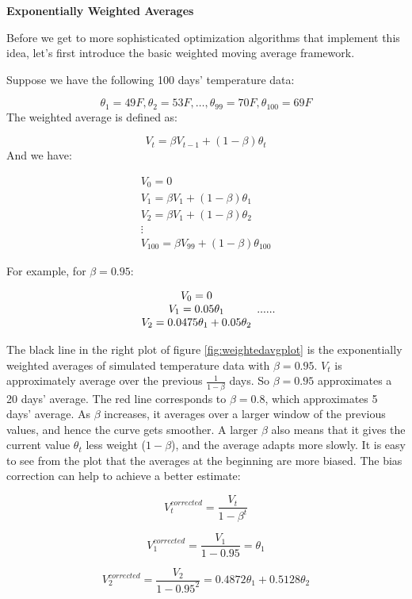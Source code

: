 \documentclass[
  12pt,
]{krantz}
\begin{document}
\textbf{Exponentially Weighted Averages}

Before we get to more sophisticated optimization algorithms that implement this idea, let's first introduce the basic weighted moving average framework.

Suppose we have the following 100 days' temperature data:

\[ \theta_{1}=49F, \theta_{2}=53F, \dots, \theta_{99}=70F, \theta_{100}=69F\]
The weighted average is defined as:

\[V_t = \beta V_{t-1}+(1-\beta)\theta_t\]
And we have:

\[
\begin{array}{c} V_{0}=0\\ V_{1}=\beta V_1 + (1-\beta)\theta_1\\ V_2=\beta V_1 + (1-\beta)\theta_2\\ \vdots \\ V_{100}= \beta V_{99} + (1-\beta)\theta_{100} \end{array}\]

For example, for \(\beta=0.95\):

\[\begin{array}{c} V_{0}=0 \\ V_{1}=0.05\theta_{1}  \\ V_{2}=0.0475\theta_{1}+0.05\theta_{2}   \end{array} \\ ......\]

The black line in the right plot of figure \ref{fig:weightedavgplot} is the exponentially weighted averages of simulated temperature data with \(\beta = 0.95\). \(V_t\) is approximately average over the previous \(\frac{1}{1-\beta}\) days. So \(\beta = 0.95\) approximates a 20 days' average. The red line corresponds to \(\beta = 0.8\), which approximates 5 days' average. As \(\beta\) increases, it averages over a larger window of the previous values, and hence the curve gets smoother. A larger \(\beta\) also means that it gives the current value \(\theta_t\) less weight (\(1-\beta\)), and the average adapts more slowly. It is easy to see from the plot that the averages at the beginning are more biased. The bias correction can help to achieve a better estimate:

\[V_t^{corrected} = \frac{V_t}{1-\beta^t}\]

\[V_{1}^{corrected}=\frac{V_{1}}{1-0.95}=\theta_{1}\]

\[V_{2}^{corrected}=\frac{V_{2}}{1-0.95^{2}}=0.4872\theta_{1}+0.5128\theta_{2}\]
\end{document}
